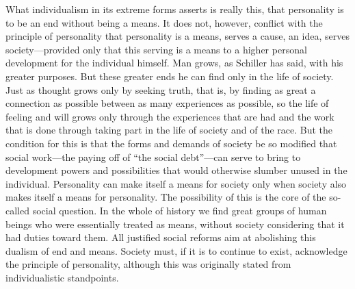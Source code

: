 \documentclass[12pt]{article}
\newcommand{\opage}[1]{\marginnote{\footnotesize\textit{[#1]}}}
\begin{document}
What individualism in its extreme forms asserts is really this, that
personality is to be an end without being a means. It does not, however,
conflict with the principle of personality that personality is a means, serves
a cause, an idea, serves society---provided only that this serving is a means to
a higher personal development for the individual himself. Man grows, as Schiller
has said, with his greater purposes. But these greater ends he can find only in
the life of society. Just as thought grows only by seeking truth, that is, by
finding as great a connection as possible between as many experiences as
possible, so the life of feeling and will grows only through the experiences
that are had and the work that is done through taking part in the life of
society and of the race. But the
\opage{44}%
condition for this is that the forms and demands of society be so modified that
social work---the paying off of ``the social debt''---can serve to bring to
development powers and possibilities that would otherwise slumber unused in the
individual. Personality can make itself a means for society only when society
also makes itself a means for personality. The possibility of this is the core
of the so-called social question. In the whole of history we find great groups
of human beings who were essentially treated as means, without society
considering that it had duties toward them. All justified social reforms aim at
abolishing this dualism of end and means. Society must, if it is to continue to
exist, acknowledge the principle of personality, although this was originally
stated from individualistic standpoints.
\end{document}
